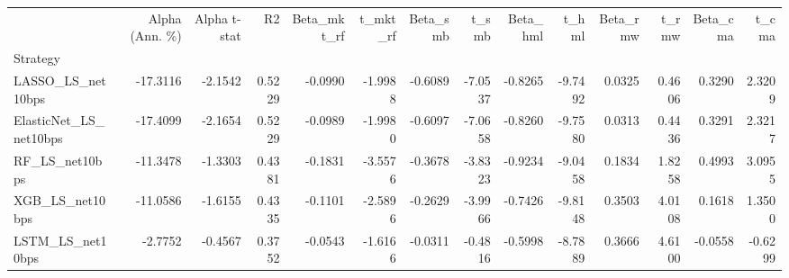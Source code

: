 \begin{tabular}{lrrrrrrrrrrrrr}
\toprule
 & Alpha (Ann. \%) & Alpha t-stat & R2 & Beta\_mkt\_rf & t\_mkt\_rf & Beta\_smb & t\_smb & Beta\_hml & t\_hml & Beta\_rmw & t\_rmw & Beta\_cma & t\_cma \\
Strategy &  &  &  &  &  &  &  &  &  &  &  &  &  \\
\midrule
LASSO\_LS\_net10bps & -17.3116 & -2.1542 & 0.5229 & -0.0990 & -1.9988 & -0.6089 & -7.0537 & -0.8265 & -9.7492 & 0.0325 & 0.4606 & 0.3290 & 2.3209 \\
ElasticNet\_LS\_net10bps & -17.4099 & -2.1654 & 0.5229 & -0.0989 & -1.9980 & -0.6097 & -7.0658 & -0.8260 & -9.7580 & 0.0313 & 0.4436 & 0.3291 & 2.3217 \\
RF\_LS\_net10bps & -11.3478 & -1.3303 & 0.4381 & -0.1831 & -3.5576 & -0.3678 & -3.8323 & -0.9234 & -9.0458 & 0.1834 & 1.8258 & 0.4993 & 3.0955 \\
XGB\_LS\_net10bps & -11.0586 & -1.6155 & 0.4335 & -0.1101 & -2.5896 & -0.2629 & -3.9966 & -0.7426 & -9.8148 & 0.3503 & 4.0108 & 0.1618 & 1.3500 \\
LSTM\_LS\_net10bps & -2.7752 & -0.4567 & 0.3752 & -0.0543 & -1.6166 & -0.0311 & -0.4816 & -0.5998 & -8.7889 & 0.3666 & 4.6100 & -0.0558 & -0.6299 \\
\bottomrule
\end{tabular}
